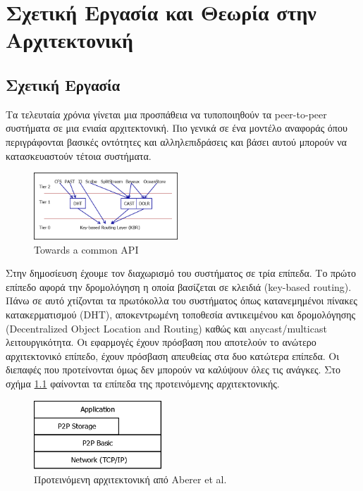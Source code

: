 \chapter{Σχετική Εργασία και Θεωρία στην Αρχιτεκτονική} 
\label{chap:Literature}

\section{Σχετική Εργασία}

Τα τελευταία χρόνια γίνεται μια προσπάθεια να τυποποιηθούν τα 
peer-to-peer συστήματα σε μια ενιαία αρχιτεκτονική. Πιο γενικά σε ένα 
μοντέλο αναφοράς όπου περιγράφονται βασικές οντότητες και 
αλληλεπιδράσεις και βάσει αυτού μπορούν να κατασκευαστούν τέτοια 
συστήματα.

\begin{figure}
  \begin{center}
    \includegraphics[width=0.48\textwidth]{Figures/Related_work/Towards_a_common_API_(tiers).png}
  \end{center}
  \caption{Towards a common API}
  \label{fig:Α_common_API}
\end{figure}
Στην δημοσίευση \citep{F.Dabek2003} έχουμε τον διαχωρισμό του συστήματος 
σε τρία επίπεδα. Το πρώτο επίπεδο αφορά την δρομολόγηση η οποία βασίζεται σε κλειδιά 
(key-based routing). Πάνω σε αυτό χτίζονται τα πρωτόκολλα του συστήματος 
όπως κατανεμημένοι πίνακες κατακερματισμού (DHT), αποκεντρωμένη 
τοποθεσία αντικειμένου και δρομολόγησης (Decentralized Object Location 
and Routing) καθώς και anycast/multicast λειτουργικότητα. Οι εφαρμογές 
έχουν πρόσβαση που αποτελούν το ανώτερο αρχιτεκτονικό επίπεδο, έχουν 
πρόσβαση απευθείας στα δυο κατώτερα επίπεδα. Οι διεπαφές που 
προτείνονται όμως δεν μπορούν να καλύψουν όλες τις ανάγκες. Στο σχήμα  
\ref{fig:Α_common_API} φαίνονται τα επίπεδα της προτεινόμενης αρχιτεκτονικής.

\begin{figure}
  \begin{center}
    \includegraphics[width=0.43\textwidth]{Figures/Related_work/The_essence_of_p2p_(architecture).png}
  \end{center}
  \caption{Προτεινόμενη αρχιτεκτονική από Aberer et al.}
  \label{fig:Essence}
\end{figure}

